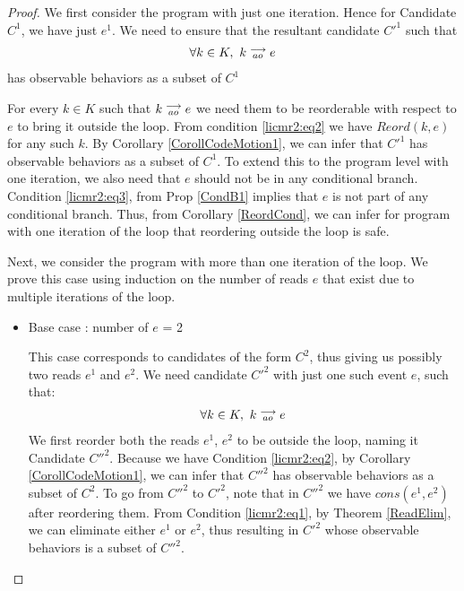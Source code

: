 \begin{proof}

    We first consider the program with just one iteration. 
    Hence for Candidate $C^1$, we have just $e^1$. 
    We need to ensure that the resultant candidate $C'^1$ such that 
    \begin{align*}
        \forall k \in K, \ k\stackrel{\longrightarrow}{_{ao}}e
    \end{align*}  
    has observable behaviors as a subset of $C^1$

    For every $k \in K$ such that $k\stackrel{\longrightarrow}{_{ao}}e$ we need them to be reorderable with respect to $e$ to bring it outside the loop.
    From condition \ref{licmr2:eq2} we have $Reord(k,e)$ for any such $k$.
    By Corollary \ref{CorollCodeMotion1}, we can infer that $C'^1$ has observable behaviors as a subset of $C^1$.
    To extend this to the program level with one iteration, we also need that $e$ should not be in any conditional branch.
    Condition \ref{licmr2:eq3}, from Prop \ref{CondB1} implies that $e$ is not part of any conditional branch.
    Thus, from Corollary \ref{ReordCond}, we can infer for program with one iteration of the loop that reordering outside the loop is safe.  
    
    
    Next, we consider the program with more than one iteration of the loop. 
    We prove this case using induction on the number of reads $e$ that exist due to multiple iterations of the loop. 

    \begin{itemize}
        
        \item Base case : number of $e$ = 2
    
        This case corresponds to candidates of the form $C^2$, thus giving us possibly two reads $e^1$ and $e^2$.
        We need candidate $C'^2$ with just one such event $e$, such that:
        \begin{align*}
            \forall k \in K, \ k\stackrel{\longrightarrow}{_{ao}}e
        \end{align*} 
        We first reorder both the reads $e^1$, $e^2$ to be outside the loop, naming it Candidate $C''^2$.
        Because we have Condition \ref{licmr2:eq2}, by Corollary \ref{CorollCodeMotion1}, we can infer that $C''^2$ has observable behaviors as a subset of $C^2$.
        To go from $C''^2$ to $C'^2$, note that in $C''^2$ we have $cons(e^1, e^2)$ after reordering them. 
        From Condition \ref{licmr2:eq1}, by Theorem \ref{ReadElim}, we can eliminate either $e^1$ or $e^2$, thus resulting in $C'^2$ whose observable behaviors is a subset of $C''^2$.
        

\end{itemize}
\end{proof}
